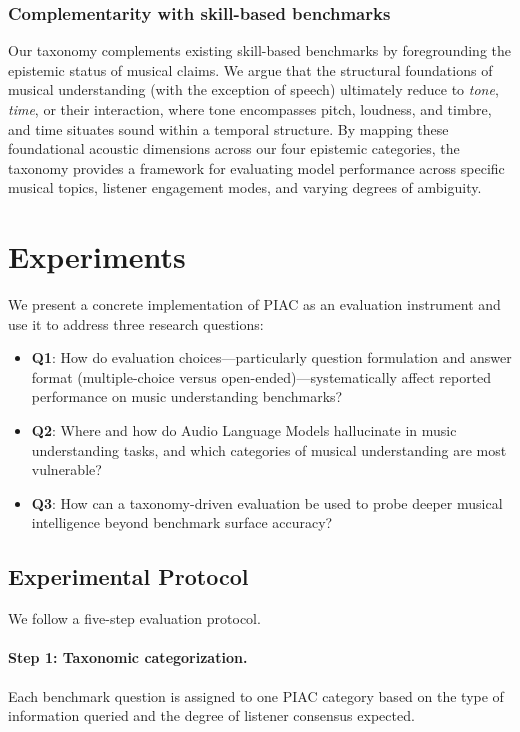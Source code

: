 \documentclass[conference,a4paper]{APSIPA2026}
\begin{document}
\subsubsection{Complementarity with skill-based benchmarks}

Our taxonomy complements existing skill-based benchmarks by foregrounding the epistemic status of musical claims. We argue that the structural foundations of musical understanding (with the exception of speech) ultimately reduce to \emph{tone}, \emph{time}, or their interaction, where tone encompasses pitch, loudness, and timbre, and time situates sound within a temporal structure. By mapping these foundational acoustic dimensions across our four epistemic categories, the taxonomy provides a framework for evaluating model performance across specific musical topics, listener engagement modes, and varying degrees of ambiguity.




\section{Experiments}
\label{sec:experiments}

We present a concrete implementation of PIAC as an evaluation instrument and use it to address three research questions:

\begin{itemize}
    \item \textbf{Q1}: How do evaluation choices—particularly question formulation and answer format (multiple-choice versus open-ended)—systematically affect reported performance on music understanding benchmarks?
    \item \textbf{Q2}: Where and how do Audio Language Models hallucinate in music understanding tasks, and which categories of musical understanding are most vulnerable?
    \item \textbf{Q3}: How can a taxonomy-driven evaluation be used to probe deeper musical intelligence beyond benchmark surface accuracy?
\end{itemize}

\subsection{Experimental Protocol}

We follow a five-step evaluation protocol.

\paragraph{Step 1: Taxonomic categorization.}
Each benchmark question is assigned to one PIAC category based on the type of information queried and the degree of listener consensus expected.
\end{document}
